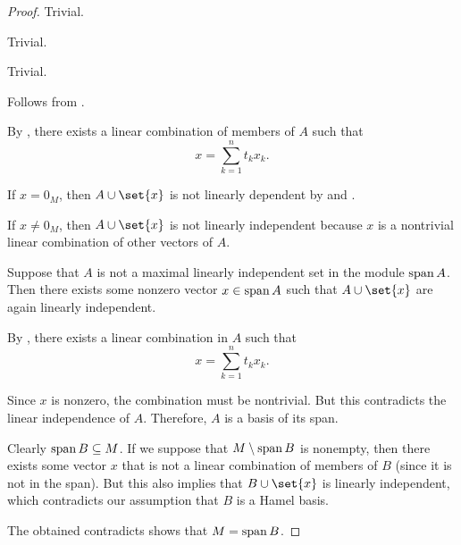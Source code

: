 \begin{proof}
   Trivial.

   Trivial.

   Trivial.

   Follows from .

   By , there exists a linear combination of members of \( A \) such that
  \begin{equation*}
    x = \sum_{k=1}^n t_k x_k.
  \end{equation*}

  If \( x = 0_M \), then \( A \cup \set{ x } \) is not linearly dependent by  and .

  If \( x \neq 0_M \), then \( A \cup \set{ x } \) is not linearly independent because \( x \) is a nontrivial linear combination of other vectors of \( A \).

   Suppose that \( A \) is not a maximal linearly independent set in the module \( \operatorname{span} A \). Then there exists some nonzero vector \( x \in \operatorname{span} A \) such that \( A \cup \set{ x } \) are again linearly independent.

  By , there exists a linear combination in \( A \) such that
  \begin{equation*}
    x = \sum_{k=1}^n t_k x_k.
  \end{equation*}

  Since \( x \) is nonzero, the combination must be nontrivial. But this contradicts the linear independence of \( A \). Therefore, \( A \) is a basis of its span.

   Clearly \( \operatorname{span}{B} \subseteq M \). If we suppose that \( M \setminus \operatorname{span}{B} \) is nonempty, then there exists some vector \( x \) that is not a linear combination of members of \( B \) (since it is not in the span). But this also implies that \( B \cup \set{ x } \) is linearly independent, which contradicts our assumption that \( B \) is a Hamel basis.

  The obtained contradicts shows that \( M = \operatorname{span}{B} \).
\end{proof}

